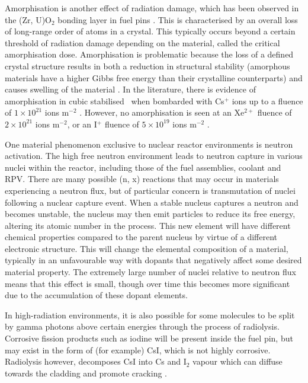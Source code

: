 Amorphisation is another effect of radiation damage, which has been observed in the (Zr, U)O$_{2}$ bonding layer in fuel pins \cite{Nogita1997}. This is characterised by an overall loss of long-range order of atoms in a crystal. This typically occurs beyond a certain threshold of radiation damage depending on the material, called the critical amorphisation dose. Amorphisation is problematic because the loss of a defined crystal structure results in both a reduction in structural stability (amorphous materials have a higher Gibbs free energy than their crystalline counterparts) and causes swelling of the material \cite{Einfal2013}. In the literature, there is evidence of amorphisation in cubic stabilised \zirconia\ when bombarded with Cs$^{+}$ ions up to a fluence of $1 \times 10^{21}$ ions m$^{-2}$ \cite{amorphization2000wang}. However, no amorphisation is seen at an Xe$^{2+}$ fluence of $2 \times 10^{21}$ ions m$^{-2}$, or an I$^{+}$ fluence of $5 \times 10^{19}$ ions m$^{-2}$ \cite{sickafus1999radiation}.

One material phenomenon exclusive to nuclear reactor environments is neutron activation. The high free neutron environment leads to neutron capture in various nuclei within the reactor, including those of the fuel assemblies, coolant and RPV. There are many possible (n, x) reactions that may occur in materials experiencing a neutron flux, but of particular concern is transmutation of nuclei following a nuclear capture event. When a stable nucleus captures a neutron and becomes unstable, the nucleus may then emit particles to reduce its free energy, altering its atomic number in the process. This new element will have different chemical properties compared to the parent nucleus by virtue of a different electronic structure. This will change the elemental composition of a material, typically in an unfavourable way with dopants that negatively affect some desired material property. The extremely large number of nuclei relative to neutron flux means that this effect is small, though over time this becomes more significant due to the accumulation of these dopant elements.

In high-radiation environments, it is also possible for some molecules to be split by gamma photons above certain energies through the process of radiolysis. Corrosive fission products such as iodine will be present inside the fuel pin, but may exist in the form of (for example) CsI, which is not highly corrosive. Radiolysis however, decomposes CsI into Cs and I$_{2}$ vapour which can diffuse towards the cladding and promote cracking \cite{Konashi1983}.

